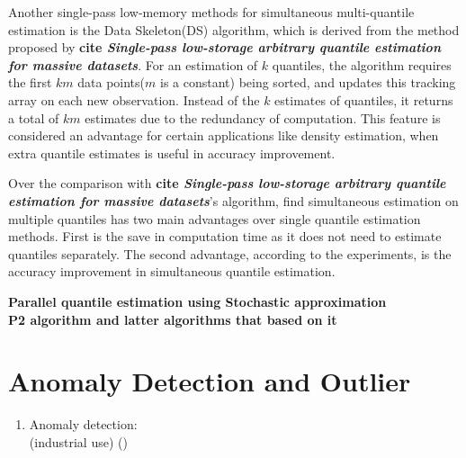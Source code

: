 \documentclass[12pt]{article}
\begin{document}
\begin{enumerate}
        Another single-pass low-memory methods for simultaneous multi-quantile estimation is the Data Skeleton(DS)\cite{mcdermottDataSkeletonsSimultaneous2007} algorithm, which is derived from the method proposed by \textbf{cite \textit{Single-pass low-storage arbitrary quantile estimation for massive datasets}}. For an estimation of $k$ quantiles, the algorithm requires the first $km$ data points($m$ is a constant) being sorted, and updates this tracking array on each new observation. Instead of the $k$ estimates of quantiles, it returns a total of $km$ estimates due to the redundancy of computation. This feature is considered an advantage for certain applications like density estimation, when extra quantile estimates is useful in accuracy improvement.

        Over the comparison with \textbf{cite \textit{Single-pass low-storage arbitrary quantile estimation for massive datasets}}'s algorithm, \citeauthor{mcdermottDataSkeletonsSimultaneous2007}\cite{mcdermottDataSkeletonsSimultaneous2007} find simultaneous estimation on multiple quantiles has two main advantages over single quantile estimation methods. First is the save in computation time as it does not need to estimate quantiles separately. The second advantage, according to the experiments, is the accuracy improvement in simultaneous quantile estimation.  


        
        \textbf{
            Parallel quantile estimation using Stochastic approximation \cite{hammerSmoothEstimatesMultiple2019}
        }
        \\
        \textbf{P2 algorithm and latter algorithms that based on it}


\end{enumerate}

\section{Anomaly Detection and Outlier}

\begin{enumerate}
    \item Anomaly detection: \\
        \cite{emmottMetaAnalysisAnomalyDetection2015}
        (industrial use)
        ()
\end{enumerate}

\newpage


\end{document}
